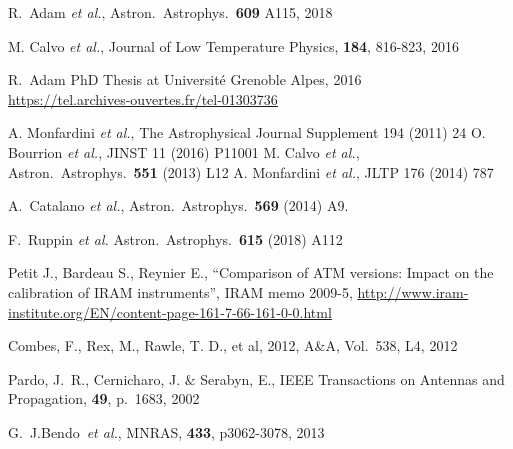 
\begin{thebibliography}{99}
  
 R.~Adam {\it et al.},
  Astron.\ Astrophys.\, {\bf 609} A115, 2018
  
M. Calvo {\it et al.},  
Journal of Low Temperature Physics, {\bf 184}, 816-823, 2016 


 R.~Adam PhD Thesis at
  Universit\'e Grenoble Alpes, 2016\\
\url{https://tel.archives-ouvertes.fr/tel-01303736}

    A. Monfardini {\it et al.}, The Astrophysical Journal Supplement 194 (2011)  24 
    O. Bourrion {\it et al.}, JINST 11 (2016) P11001 
    M. Calvo {\it et al.}, Astron.\ Astrophys.\  {\bf 551} (2013) L12
 A. Monfardini {\it et al.}, JLTP 176 (2014) 787
    
 
  A.~Catalano {\it et al.},
  Astron.\ Astrophys.\  {\bf 569} (2014) A9.
  
     F.~Ruppin {\it et al.}
     Astron.\ Astrophys.\  {\bf 615} (2018) A112 

     
Petit J., Bardeau S., Reynier E., ``Comparison of ATM versions: Impact
on the calibration of IRAM instruments'', IRAM memo 2009-5,
\url{http://www.iram-institute.org/EN/content-page-161-7-66-161-0-0.html}

 Combes, F., Rex, M., Rawle, T. D., et al, 2012, A\&A,
  Vol.~538, L4, 2012

  Pardo, J.~R., Cernicharo, J. $\&$ Serabyn, E., IEEE Transactions on
  Antennas and Propagation, {\bf 49}, p.~1683, 2002
  
  G.~J.Bendo~{\it et al.}, MNRAS, {\bf 433}, p{3062-3078}, 2013 


\end{thebibliography}
